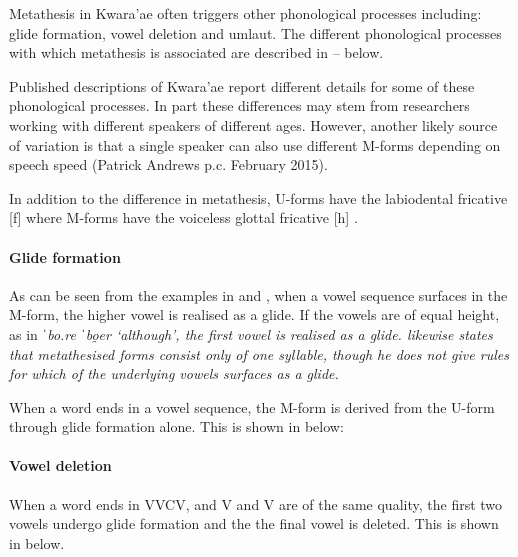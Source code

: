 Metathesis in Kwara'ae often triggers other phonological processes
including: glide formation, vowel deletion and umlaut.
The different phonological processes with which metathesis
is associated are described in -- below.

Published descriptions of Kwara'ae report different
details for some of these phonological processes.
In part these differences may stem from researchers working
with different speakers of different ages.
However, another likely source of variation
is that a single speaker can also use
different M-forms depending on speech speed
(Patrick Andrews p.c. February 2015).

In addition to the difference in metathesis,
U-forms have the labiodental fricative [f]
where M-forms have the voiceless glottal fricative [h] \citep[18]{he04}.

\paragraph{Glide formation}\label{sec:KwaGliFor}
As can be seen from the examples in  and ,
when a vowel sequence surfaces in the M-form,
the higher vowel is realised as a glide. %
If the vowels are of equal height,
as in \it{ˈbo.re} {\ra} \it{ˈbo̯er} `although',
the first vowel is realised as a glide.
\citet[319]{so80} likewise states that metathesised forms consist only of one syllable,
though he does not give rules for which of the underlying vowels surfaces as a glide.

When a word ends in a vowel sequence,
the M-form is derived from the U-form through glide formation alone.
This is shown in  below:

\begin{exe}
\label{KwaVV}
\end{exe}

\paragraph{Vowel deletion}
When a word ends in VVCV,
and V and V are of the same quality,
the first two vowels undergo glide formation and the
the final vowel is deleted.
This is shown in  below.


